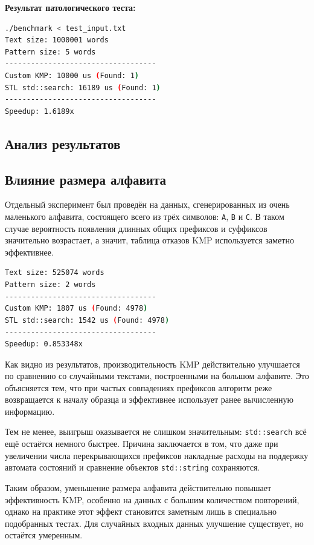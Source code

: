 \textbf{Результат патологического теста:}

\begin{lstlisting}[language=bash]
./benchmark < test_input.txt
Text size: 1000001 words
Pattern size: 5 words
-----------------------------------
Custom KMP: 10000 us (Found: 1)
STL std::search: 16189 us (Found: 1)
-----------------------------------
Speedup: 1.6189x
\end{lstlisting}

\subsection{Анализ результатов}

\subsection{Влияние размера алфавита}

Отдельный эксперимент был проведён на данных, сгенерированных из очень маленького алфавита, состоящего всего из трёх символов: \texttt{A}, \texttt{B} и \texttt{C}. В таком случае вероятность появления длинных общих префиксов и суффиксов значительно возрастает, а значит, таблица отказов KMP используется заметно эффективнее.

\begin{lstlisting}[language=bash]
Text size: 525074 words
Pattern size: 2 words
-----------------------------------
Custom KMP: 1807 us (Found: 4978)
STL std::search: 1542 us (Found: 4978)
-----------------------------------
Speedup: 0.853348x
\end{lstlisting}

Как видно из результатов, производительность KMP действительно улучшается по сравнению со случайными текстами, построенными на большом алфавите. Это объясняется тем, что при частых совпадениях префиксов алгоритм реже возвращается к началу образца и эффективнее использует ранее вычисленную информацию.

Тем не менее, выигрыш оказывается не слишком значительным: \texttt{std::search} всё ещё остаётся немного быстрее. Причина заключается в том, что даже при увеличении числа перекрывающихся префиксов накладные расходы на поддержку автомата состояний и сравнение объектов \texttt{std::string} сохраняются.

Таким образом, уменьшение размера алфавита действительно повышает эффективность KMP, особенно на данных с большим количеством повторений, однако на практике этот эффект становится заметным лишь в специально подобранных тестах. Для случайных входных данных улучшение существует, но остаётся умеренным.

